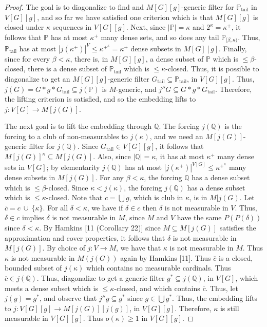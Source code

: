 \documentclass[10pt,leqno]{amsart}
\begin{document}
\begin{proof}
The goal is to diagonalize to find and $M[G][g]$-generic filter for $\mathbb{P}_{\mbox{tail}}$ in $V[G][g]$, and so far we have satisfied one criterion which is that $M[G][g]$ is closed under $\kappa$ sequences in $V[G][g]$. Next, since $|\mathbb{P}| = \kappa$ and $2^{\kappa} = \kappa^+$, it follows that $\mathbb{P}$ has at most $\kappa^+$ many dense sets, and so does any tail $\mathbb{P}_{[\beta, \kappa)}$. Thus, $\mathbb{P}_{\mbox{tail}}$ has at most $|j(\kappa^+)|^{V} \le \kappa^{+^{\kappa}} = \kappa^+$ dense subsets in $M[G][g]$. Finally, since for every $\beta < \kappa$, there is, in $M[G][g]$, a dense subset of $\mathbb{P}$ which is $\le \beta$-closed, there is a dense subset of $\mathbb{P}_{\mbox{tail}}$ which is $\le \kappa$-closed. Thus, it is possible to diagonalize to get an $M[G][g]$-generic filter $G_{\mbox{tail}} \subseteq \mathbb{P}_{\mbox{tail}}$, in $V[G][g]$. Thus, $j(G) = G*g*G_{\mbox{tail}} \subseteq j(\mathbb{P})$ is $M$-generic, and $j''G \subseteq G*g*G_{\mbox{tail}}$. Therefore, the lifting criterion is satisfied, and so the embedding lifts to $j:V[G] \to M[j(G)]$.

The next goal is to lift the embedding through $\mathbb{Q}$. The forcing $j(\mathbb{Q})$ is the forcing to a club of non-measurables to $j(\kappa)$, and we need an $M[j(G)]$-generic filter for $j(\mathbb{Q})$. Since $G_{\mbox{tail}} \in V[G][g]$, it follows that $M[j(G)]^{\kappa} \subseteq M[j(G)]$. Also, since $|\mathbb{Q}| = \kappa$, it has at most $\kappa^+$ many dense sets in $V[G]$; by elementarity $j(\mathbb{Q})$ has at most $|j(\kappa^+)|^{V[G]} \le \kappa^{+^{\kappa}}$ many dense subsets in $M[j(G)]$. For any $\beta < \kappa$, the forcing $\mathbb{Q}$ has a dense subset which is $\le \beta$-closed. Since $\kappa < j(\kappa)$, the forcing $j(\mathbb{Q})$ has a dense subset which is $\le \kappa$-closed. Note that $c = \bigcup g$, which is club in $\kappa$, is in $M[j(G)$. Let $\overline{c} = c \ \cup \ \{\kappa\}$. For all $\delta < \kappa$, we have if $\delta \in c$ then $\delta$ is not measurable in $V$. Thus, $\delta \in c$ implies $\delta$ is not measurable in $M$, since $M$ and $V$ have the same $P(P(\delta))$ since $\delta < \kappa$. By Hamkins [11 (Corollary 22)] since $M \subseteq M[j(G)]$ satisfies the approximation and cover properties, it follows that $\delta$ is not measurable in $M[j(G)]$. By choice of $j:V \to M$, we have that $\kappa$ is not measurable in $M$. Thus $\kappa$ is not measurable in $M(j(G))$ again by Hamkins [11]. Thus $\overline{c}$ is a closed, bounded subset of $j(\kappa)$ which contains no measurable cardinals. Thus $\overline{c} \in j(\mathbb{Q})$. Thus, diagonalize to get a generic filter $g^* \subseteq j(\mathbb{Q})$, in $V[G]$, which meets a dense subset which is $\le \kappa$-closed, and which contains $\overline{c}$. Thus, let $j(g) = g^*$, and observe that $j''g \subseteq g^*$ since $g \in \bigcup g^*$. Thus, the embedding lifts to $j:V[G][g] \to M[j(G)][j(g)]$, in $V[G][g]$. Therefore, $\kappa$ is still measurable in $V[G][g]$. Thus $o(\kappa) \ge 1$ in $V[G][g]$.


\end{proof}
\end{document}
